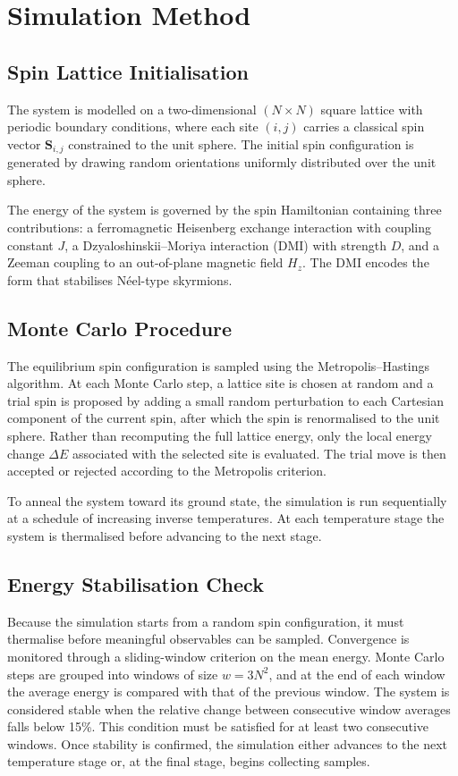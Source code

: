 \section{Simulation Method}

\subsection{Spin Lattice Initialisation}

The system is modelled on a two-dimensional $(N \times N)$ square lattice with periodic boundary conditions, where each site $(i,j)$ carries a classical spin vector $\mathbf{S}_{i,j}$ constrained to the unit sphere. The initial spin configuration is generated by drawing random orientations uniformly distributed over the unit sphere.

The energy of the system is governed by the spin Hamiltonian containing three contributions: a ferromagnetic Heisenberg exchange interaction with coupling constant $J$, a Dzyaloshinskii--Moriya interaction (DMI) with strength $D$, and a Zeeman coupling to an out-of-plane magnetic field $H_z$. The DMI encodes the form that stabilises Néel-type skyrmions.

\subsection{Monte Carlo Procedure}

The equilibrium spin configuration is sampled using the Metropolis--Hastings algorithm. At each Monte Carlo step, a lattice site is chosen at random and a trial spin is proposed by adding a small random perturbation to each Cartesian component of the current spin, after which the spin is renormalised to the unit sphere. Rather than recomputing the full lattice energy, only the local energy change $\Delta E$ associated with the selected site is evaluated. The trial move is then accepted or rejected according to the Metropolis criterion.

To anneal the system toward its ground state, the simulation is run sequentially at a schedule of increasing inverse temperatures. At each temperature stage the system is thermalised before advancing to the next stage.

\subsection{Energy Stabilisation Check}

Because the simulation starts from a random spin configuration, it must thermalise before meaningful observables can be sampled. Convergence is monitored through a sliding-window criterion on the mean energy. Monte Carlo steps are grouped into windows of size $w = 3N^2$, and at the end of each window the average energy is compared with that of the previous window. The system is considered stable when the relative change between consecutive window averages falls below 15\%. This condition must be satisfied for at least two consecutive windows. Once stability is confirmed, the simulation either advances to the next temperature stage or, at the final stage, begins collecting samples.

